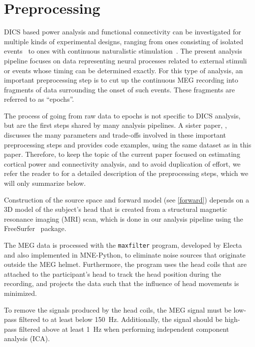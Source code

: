 \documentclass[utf8]{frontiersSCNS}
\renewcommand{\cite}[1]{~\citep{#1}}
\newcommand{\textcite}[1]{\citet{#1}}
\newcommand{\code}[1]{\lstinline{#1}}
\begin{document}
\section{Preprocessing}\label{preprocessing}

DICS based power analysis and functional connectivity can be investigated for multiple kinds of experimental designs, ranging from ones consisting of isolated events\cite{Laaksonen2008} to ones with continuous naturalistic stimulation\cite{Saarinen2015, Alexandrou2017}.
The present analysis pipeline focuses on data representing neural processes related to external stimuli or events whose timing can be determined exactly. 
For this type of analysis, an important preprocessing step is to cut up the continuous MEG recording into fragments of data surrounding the onset of such events.
These fragments are referred to as ``epochs''.

The process of going from raw data to epochs is not specific to DICS analysis, but are the first steps shared by many analysis pipelines.
A sister paper, \textcite{Jas2017}, discusses the many parameters and trade-offs involved in these important preprocessing steps and provides code examples, using the same dataset as in this paper.
Therefore, to keep the topic of the current paper focused on estimating cortical power and connectivity analysis, and to avoid duplication of effort, we refer the reader to \textcite{Jas2017} for a detailed description of the preprocessing steps, which we will only summarize below.

Construction of the source space and forward model (see \autoref{forward}) depends on a 3D model of the subject's head that is created from a structural magnetic resonance imaging (MRI) scan, which is done in our analysis pipeline using the FreeSurfer\cite{freesurfer} package.

The MEG data is processed with the \code{maxfilter} program, developed by Electa and also implemented in MNE-Python, to eliminate noise sources that originate outside the MEG helmet.
Furthermore, the program uses the head coils that are attached to the participant's head to track the head position during the recording, and projects the data such that the influence of head movements is minimized.

To remove the signals produced by the head coils, the MEG signal must be low-pass filtered to at least below \SI{150}{\hertz}.
Additionally, the signal should be high-pass filtered above at least \SI{1}{\hertz} when performing independent component analysis (ICA).
\end{document}
